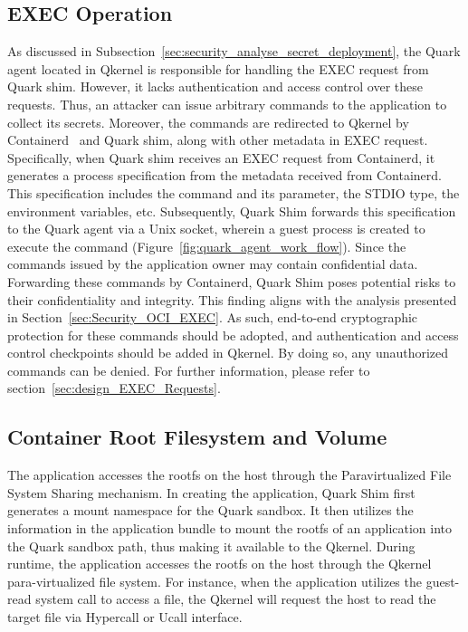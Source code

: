 \subsection{EXEC Operation}
As discussed in Subsection~\ref{sec:security_analyse_secret_deployment}, the Quark agent located in Qkernel is responsible for handling the EXEC request from Quark shim. However, it lacks authentication and access control over these requests. Thus, an attacker can issue arbitrary commands to the application to collect its secrets. Moreover, the commands are 
redirected to Qkernel by Containerd~\cite*{containerd} and Quark shim, along with other metadata in EXEC request. Specifically, when Quark shim receives an EXEC request from Containerd, it generates a process specification from the metadata received from Containerd. This specification includes the command and its parameter, the STDIO type, the environment 
variables, etc. Subsequently, Quark Shim forwards this specification to the Quark agent via a Unix socket, wherein a guest process is created to execute the command (Figure~\ref{fig:quark_agent_work_flow}). Since the commands issued by the application owner may contain confidential data. Forwarding these commands by Containerd, Quark Shim poses potential risks 
to their confidentiality and integrity. This finding aligns with the analysis presented in Section~\ref{sec:Security_OCI_EXEC}. As such, end-to-end cryptographic protection for these commands should be adopted, and authentication and access control checkpoints should be added in Qkernel. By doing so, any unauthorized commands can be denied. For further information, 
please refer to section~\ref{sec:design_EXEC_Requests}.


\subsection{Container Root Filesystem and Volume}
The application accesses the rootfs on the host through the Paravirtualized File System Sharing mechanism. In creating the application, Quark Shim first generates a mount namespace for the Quark sandbox. It then utilizes the information in the application bundle to mount the rootfs of an application 
into the Quark sandbox path, thus making it available to the Qkernel. During runtime, the application accesses the rootfs on the host through the Qkernel para-virtualized file system. For instance, when the application utilizes the guest-read system call to access a file, the Qkernel will request 
the host to read the target file via Hypercall or Ucall interface. 

